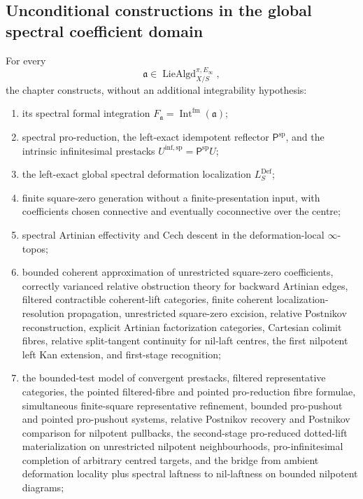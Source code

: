 \subsection{Unconditional constructions in the global spectral coefficient domain}

For every
\[
    \mathfrak a
    \in
    \operatorname{LieAlgd}^{\pi,E_\infty}_{X/S},
\]
the chapter constructs, without an additional integrability hypothesis:
\begin{enumerate}
    \item its spectral formal integration
    $F_{\mathfrak a}=\operatorname{Int}^{\mathrm{fm}}(\mathfrak a)$;
    \item spectral pro-reduction, the left-exact idempotent reflector
    $\mathsf P^{\mathrm{sp}}$, and the intrinsic infinitesimal prestacks
    $U^{\mathrm{inf,sp}}=\mathsf P^{\mathrm{sp}}U$;
    \item the left-exact global spectral deformation localization
    $L_S^{\mathrm{Def}}$;
    \item finite square-zero generation without a finite-presentation input,
    with coefficients chosen connective and eventually coconnective over the
    centre;
    \item spectral Artinian effectivity and Cech descent in the deformation-local
    $\infty$-topos;
    \item bounded coherent approximation of unrestricted square-zero
    coefficients, correctly varianced relative obstruction theory for backward
    Artinian edges, filtered contractible coherent-lift categories, finite coherent
    localization-resolution propagation, unrestricted square-zero excision, relative
    Postnikov reconstruction, explicit Artinian factorization categories,
    Cartesian colimit fibres, relative split-tangent continuity for nil-laft
    centres, the first nilpotent left Kan extension, and first-stage
    recognition;
    \item the bounded-test model of convergent prestacks, filtered representative
    categories, the pointed filtered-fibre and pointed pro-reduction fibre
    formulae, simultaneous finite-square representative refinement, bounded
    pro-pushout and pointed pro-pushout systems, relative Postnikov recovery
    and Postnikov comparison for nilpotent pullbacks, the second-stage pro-reduced
    dotted-lift materialization on unrestricted nilpotent neighbourhoods,
    pro-infinitesimal completion of arbitrary centred targets, and the bridge
    from ambient deformation locality plus spectral laftness to nil-laftness on bounded nilpotent diagrams;

\end{enumerate}

